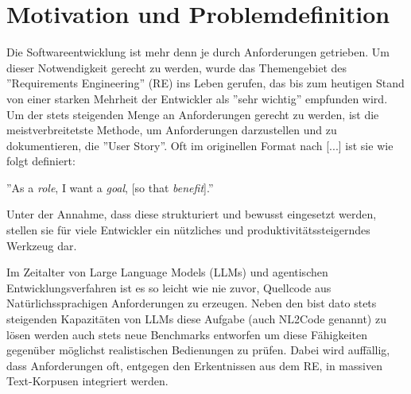 %
\chapter{Motivation und Problemdefinition}\label{ch:Motivation und Problemdefinition}


Die Softwareentwicklung ist mehr denn je durch Anforderungen getrieben. Um dieser Notwendigkeit gerecht zu werden, wurde das Themengebiet des ''Requirements Engineering'' (RE) ins Leben gerufen, das bis zum heutigen Stand von einer starken Mehrheit der Entwickler als ''sehr wichtig'' empfunden wird.\cite{wangRoleRequirementsEngineering2014} Um der stets steigenden Menge an Anforderungen gerecht zu werden, ist die meistverbreitetste Methode, um Anforderungen darzustellen und zu dokumentieren, die ''User Story''\cite{wangRoleRequirementsEngineering2014}. Oft im originellen Format nach [...] ist sie wie folgt definiert:

''As a \textlangle \textit{role}\textrangle, I want a \textlangle \textit{goal}\textrangle, [so that \textlangle \textit{benefit}\textrangle].''

Unter der Annahme, dass diese strukturiert und bewusst eingesetzt werden, stellen sie für viele Entwickler ein nützliches und produktivitätssteigerndes Werkzeug dar.\cite{lucassenUseEffectivenessUser2016}

Im Zeitalter von Large Language Models (LLMs) und agentischen Entwicklungsverfahren ist es so leicht wie nie zuvor, Quellcode aus Natürlichssprachigen Anforderungen zu erzeugen. Neben den bist dato stets steigenden Kapazitäten von LLMs diese Aufgabe (auch NL2Code genannt) zu lösen werden auch stets neue Benchmarks entworfen um diese Fähigkeiten gegenüber möglichst realistischen Bedienungen zu prüfen.\cite{jiangSurveyLargeLanguage2026} Dabei wird auffällig, dass Anforderungen oft, entgegen den Erkentnissen aus dem RE, in massiven Text-Korpusen integriert werden.


